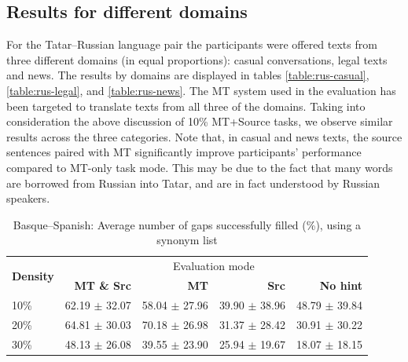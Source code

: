 \documentclass[11pt]{article}
\newcommand{\comment}[1]{\marginpar{\scriptsize\sf \textcolor{blue}{#1}}}
\begin{document}
\subsection{Results for different domains}
\comment{EA: and what would we like to say about those? The results depend heavily on the Tatar--Russian system. Do we have to provide info on what vocabulary it handles better, what it has and has not been trained on? Or do we just say that casual texts are easier to fill than legal texts?}
For the Tatar--Russian language pair the participants were offered texts from three different domains (in equal proportions): casual conversations, legal texts and news. The results by domains are displayed in tables \ref{table:rus-casual}, \ref{table:rus-legal}, and \ref{table:rus-news}. The MT system used in the evaluation has been targeted to translate texts from all three of the domains. Taking into consideration the above discussion of 10\% MT+Source tasks, we observe similar results across the three categories. Note that, in casual and news texts, the source sentences paired with MT significantly improve participants' performance compared to MT-only task mode. This may be due to the fact that many words are borrowed from Russian into Tatar, and are in fact understood by Russian speakers.


\begin{table}
\centering
  \begin{tabular}{|l|r|r|r|r|}
  \hline
 \multirow{2}{*}{\textbf{Density}} & \multicolumn{4}{|c|}{Evaluation mode} \\\cline{2-5}
                                            & \textbf{MT \& Src} & \textbf{MT} & \textbf{Src} & \textbf{No hint} \\
\hline
10\%&62.19 \(\pm\) 32.07&58.04 \(\pm\) 27.96&39.90 \(\pm\) 38.96&48.79 \(\pm\) 39.84\\
20\%&64.81 \(\pm\) 30.03&70.18 \(\pm\) 26.98&31.37 \(\pm\) 28.42&30.91 \(\pm\) 30.22\\
30\%&48.13 \(\pm\) 26.08&39.55 \(\pm\) 23.90&25.94 \(\pm\) 19.67&18.07 \(\pm\) 18.15\\
\hline
\end{tabular}
\caption {Basque--Spanish: Average number of gaps successfully filled (\%), using a synonym list} \label{table:res-eus-spa}
\end{table}
\end{document}
